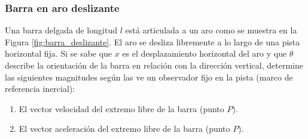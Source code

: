 \subsubsection{Barra en aro deslizante}

Una barra delgada de longitud $l$ está articulada a un aro como se muestra en la Figura \ref{fig:barra_deslizante}. El aro se desliza libremente a lo largo de una pista horizontal fija. Si se sabe que $x$ es el desplazamiento horizontal del aro y que $\theta$ describe la orientación de la barra en relación con la dirección vertical, determine las siguientes magnitudes según las ve un observador fijo en la pista (marco de referencia inercial):

\begin{enumerate}
    \item El vector velocidad del extremo libre de la barra (punto $P$).
    \item El vector aceleración del extremo libre de la barra (punto $P$).
\end{enumerate}

